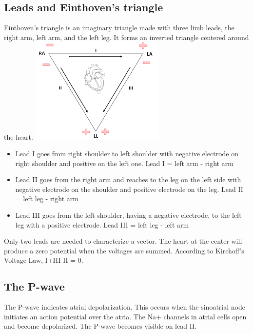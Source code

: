 \documentclass[11pt]{book}
\begin{document}
\subsection{Leads and Einthoven's triangle}
Einthoven's triangle is an imaginary triangle made with three limb leads, the right arm, left arm, and the left leg. It forms an inverted triangle centered around the heart. 
\includegraphics[width=\textwidth]{figures/lecture17_triangle.png}
\begin{itemize}
	\item Lead I goes from right shoulder to left shoulder with negative electrode on right shoulder and positive on the left one.
	Lead I = left arm - right arm
	\item Lead II goes from the right arm and reaches to the leg on the left side with negative electrode on the shoulder and positive electrode on the leg.
	Lead II = left leg - right arm 
	\item Lead III goes from the left shoulder, having a negative electrode, to the left leg with a positive electrode.
	Lead III = left leg - left arm
\end{itemize}
Only two leads are needed to characterize a vector.
The heart at the center will produce a zero potential when the voltages are summed. According to Kirchoff's Voltage Law, I+III-II = 0.
\subsection{The P-wave}
The P-wave indicates atrial depolarization. This occurs when the sinoatrial node initiates an action potential over the atria. The Na+ channels in atrial cells open and become depolarized. The P-wave becomes visible on lead II.
\end{document}
